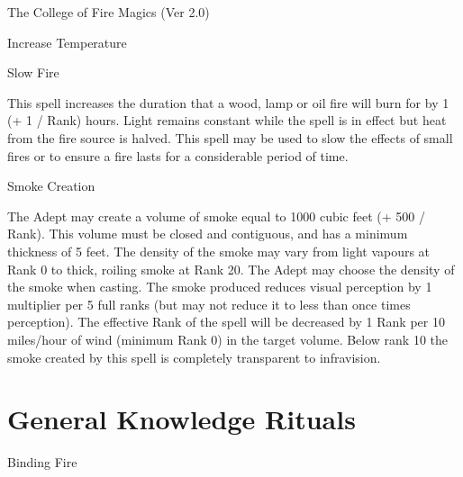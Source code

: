 \begin{Chapter}{The College of Fire Magics (Ver 2.0)}
\begin{spell}[G-6]{Increase Temperature}
\begin{effects}
\end{effects}
\end{spell}

\begin{spell}[G-7]{Slow Fire}

\begin{effects}
This spell increases the duration that a wood, lamp or oil fire will
burn for by 1 (+ 1 / Rank) hours. Light remains constant while the
spell is in effect but heat from the fire source is halved.  This
spell may be used to slow the effects of small fires or to ensure a
fire lasts for a considerable period of time.
\end{effects}
\end{spell}

\begin{spell}[G-8]{Smoke Creation}

\begin{effects}
The Adept may create a volume of smoke equal to 1000 cubic feet (+ 500
/ Rank). This volume must be closed and contiguous, and has a minimum
thickness of 5 feet.  The density of the smoke may vary from light
vapours at Rank 0 to thick, roiling smoke at Rank 20.  The Adept may
choose the density of the smoke when casting. The smoke produced
reduces visual perception by 1 multiplier per 5 full ranks (but may
not reduce it to less than once times perception).  The effective Rank
of the spell will be decreased by 1 Rank per 10 miles/hour of wind
(minimum Rank 0) in the target volume. Below rank 10 the smoke created
by this spell is completely transparent to infravision.
\end{effects}
\end{spell}

\section{General Knowledge Rituals}

\begin{ritual}[Q-1]{Binding Fire}


\end{ritual}
\end{Chapter}
